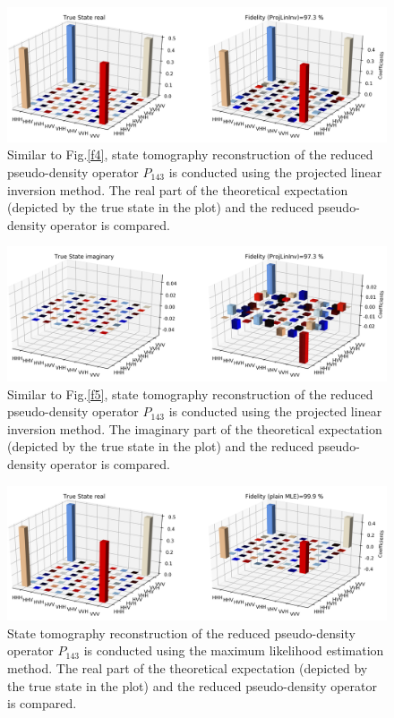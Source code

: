 \documentclass[fleqn,usenatbib]{mnras}
\begin{document}
\begin{figure}
\centering
	\includegraphics[width=\textwidth]{plots/three_d_plot_real_ProjLinInv_crop.png}
    \caption{Similar to Fig.\ref{f4}, state tomography reconstruction of the reduced pseudo-density operator $P_{143}$ is conducted using the projected linear inversion method. The real part of the theoretical expectation (depicted by the true state in the plot) and the reduced pseudo-density operator is compared.}
    \label{f6}
\end{figure}

\begin{figure}
\centering
	\includegraphics[width=\textwidth]{plots/three_d_plot_imaginary_ProjLinInv_crop.png}
    \caption{Similar to Fig.\ref{f5}, state tomography reconstruction of the reduced pseudo-density operator $P_{143}$ is conducted using the projected linear inversion method. The imaginary part of the theoretical expectation (depicted by the true state in the plot) and the reduced pseudo-density operator is compared.}
    \label{f7}
\end{figure}
\begin{figure}
\centering
	\includegraphics[width=\textwidth]{plots/three_d_plot_real_plain MLE_crop.png}
    \caption{State tomography reconstruction of the reduced pseudo-density operator $P_{143}$ is conducted using the maximum likelihood estimation method. The real part of the theoretical expectation (depicted by the true state in the plot) and the reduced pseudo-density operator is compared.}
    \label{f8}
\end{figure}
\end{document}
